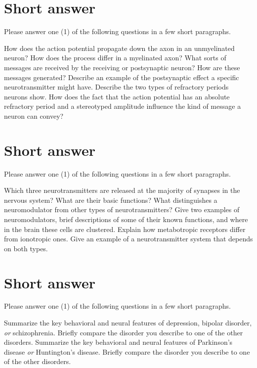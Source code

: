 \documentclass[]{exam}
\begin{document}
\begin{questions}
\newpage
\section{Short answer}

Please answer one (1) of the following questions in a few short paragraphs.

\question  How does the action potential propagate down the axon in an unmyelinated neuron?  How does the process differ in a myelinated axon?
\vspace{2.5in}
\question  What sorts of messages are received by the receiving or postsynaptic neuron?  How are these messages generated?  Describe an example of the postsynaptic effect a specific neurotransmitter might have.
\vspace{2.5in}
\question  Describe the two types of refractory periods neurons show.  How does the fact that the action potential has an absolute refractory period and a stereotyped amplitude influence the kind of message a neuron can convey? 

\newpage
\section{Short answer}

Please answer one (1) of the following questions in a few short paragraphs.

\question  Which three neurotransmitters are released at the majority of synapses in the nervous system?  What are their basic functions?
\vspace{2.5in}
\question  What distinguishes a neuromodulator from other types of neurotransmitters?  Give two examples of neuromodulators, brief descriptions of some of their known functions, and where in the brain these cells are clustered.
\vspace{2.5in}
\question  Explain how metabotropic receptors differ from ionotropic ones.  Give an example of a neurotransmitter system that depends on both types.

\newpage
\section{Short answer}

Please answer one (1) of the following questions in a few short paragraphs.

\question Summarize the key behavioral and neural features of depression, bipolar disorder, \emph{or} schizophrenia. Briefly compare the disorder you describe to one of the other disorders.
\vspace{2.5in}
\question Summarize the key behavioral and neural features of Parkinson's disease \emph{or} Huntington's disease. Briefly compare the disorder you describe to one of the other disorders.
\vspace{2.5in}


\end{questions}
\end{document}

